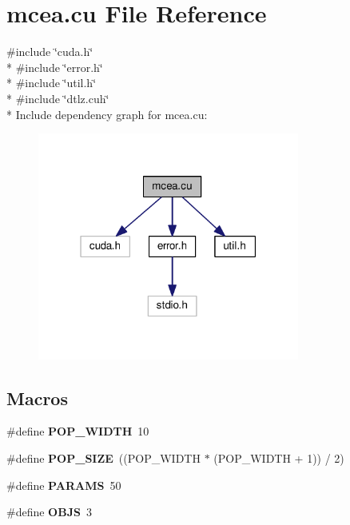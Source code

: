 \hypertarget{mcea_8cu}{}\section{mcea.\+cu File Reference}
\label{mcea_8cu}
{\ttfamily \#include \char`\"{}cuda.\+h\char`\"{}}\\*
{\ttfamily \#include \char`\"{}error.\+h\char`\"{}}\\*
{\ttfamily \#include \char`\"{}util.\+h\char`\"{}}\\*
{\ttfamily \#include \char`\"{}dtlz.\+cuh\char`\"{}}\\*
Include dependency graph for mcea.\+cu\+:\nopagebreak
\begin{figure}[H]
\begin{center}
\leavevmode
\includegraphics[width=244pt]{mcea_8cu__incl}
\end{center}
\end{figure}
\subsection*{Macros}
\begin{DoxyCompactItemize}
\item 
\#define {\bfseries P\+O\+P\+\_\+\+W\+I\+D\+TH}~10\hypertarget{mcea_8cu_a078505a45e5598fe76de40d43e70e48a}{}\label{mcea_8cu_a078505a45e5598fe76de40d43e70e48a}

\item 
\#define {\bfseries P\+O\+P\+\_\+\+S\+I\+ZE}~((P\+O\+P\+\_\+\+W\+I\+D\+TH $\ast$ (P\+O\+P\+\_\+\+W\+I\+D\+TH + 1)) / 2)\hypertarget{mcea_8cu_aea5b3e4c9df97408e95b67cdf3f992fb}{}\label{mcea_8cu_aea5b3e4c9df97408e95b67cdf3f992fb}

\item 
\#define {\bfseries P\+A\+R\+A\+MS}~50\hypertarget{mcea_8cu_ab0b1e59d96396ba9dca2147f9feb44eb}{}\label{mcea_8cu_ab0b1e59d96396ba9dca2147f9feb44eb}

\item 
\#define {\bfseries O\+B\+JS}~3\hypertarget{mcea_8cu_ad15e0f6530352f2b65cb6147c597c61b}{}\label{mcea_8cu_ad15e0f6530352f2b65cb6147c597c61b}

\end{DoxyCompactItemize}
